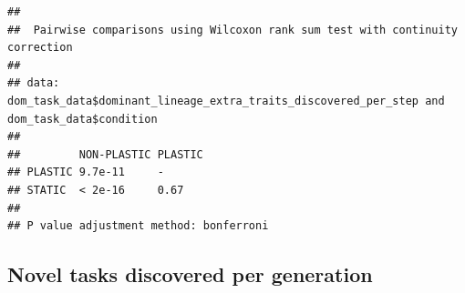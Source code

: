 \documentclass[]{book}
\newenvironment{Shaded}{\begin{snugshade}}{\end{snugshade}}
\newcommand{\DataTypeTok}[1]{\textcolor[rgb]{0.13,0.29,0.53}{#1}}
\newcommand{\FloatTok}[1]{\textcolor[rgb]{0.00,0.00,0.81}{#1}}
\newcommand{\KeywordTok}[1]{\textcolor[rgb]{0.13,0.29,0.53}{\textbf{#1}}}
\newcommand{\NormalTok}[1]{#1}
\newcommand{\OperatorTok}[1]{\textcolor[rgb]{0.81,0.36,0.00}{\textbf{#1}}}
\newcommand{\OtherTok}[1]{\textcolor[rgb]{0.56,0.35,0.01}{#1}}
\newcommand{\StringTok}[1]{\textcolor[rgb]{0.31,0.60,0.02}{#1}}
\begin{document}
\begin{Shaded}
\end{Shaded}

\begin{verbatim}
## 
##  Pairwise comparisons using Wilcoxon rank sum test with continuity correction 
## 
## data:  dom_task_data$dominant_lineage_extra_traits_discovered_per_step and dom_task_data$condition 
## 
##         NON-PLASTIC PLASTIC
## PLASTIC 9.7e-11     -      
## STATIC  < 2e-16     0.67   
## 
## P value adjustment method: bonferroni
\end{verbatim}

\hypertarget{novel-tasks-discovered-per-generation}{%
\subsection{Novel tasks discovered per generation}\label{novel-tasks-discovered-per-generation}}
\end{document}
